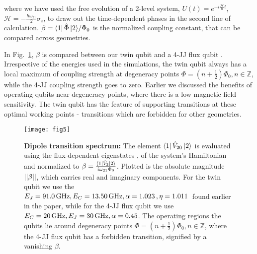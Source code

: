 \noindent  where  we have  used  the  free evolution  of  a
2-level  system,  $ U(t)=e^{-i  \frac{\mathcal{H}}{\hbar}t}  $,
$ \mathcal{H}  = -\frac{\hbar\omega_{21}}{2}\sigma_z  $, to draw  out the
time-dependent phases  in the  second line  of calculation.
$\beta  = {\Bra{1}\hat{\Phi}\Ket{2}}/{\Phi_0}  $ is  the normalized
coupling constant, that can be compared across geometries.

In Fig.~\ref{fig:fig5},  $\beta$ is  compared between  our twin
qubit   and  a   4-JJ   flux   qubit  \cite{honigl2018}   .
Irrespective of  the energies used in  the simulations, the
twin qubit always has a  local maximum of coupling strength
at                     degeneracy                    points
$ \Phi  = (n+\frac{1}{2})\Phi_0,  n\in\mathbb{Z} $, while  the 4-JJ
coupling strength  goes to  zero. Earlier we  discussed the
benefits of operating qubits  near degeneracy points, where
there is a low magnetic  field sensitivity.  The twin qubit
has  the  feature   of  supporting  \ilra  {}
transitions at  these optimal working points  - transitions
which are forbidden for other geometries.

\begin{figure}[h]
  \centering \texttt{[image: fig5]}
  \caption{\small \textbf{Dipole  transition spectrum:} The
    element $  \Bra{1}\hat{V}_{20}\Ket{2} $  is evaluated
    using the flux-dependent eigenstates , 
    of the  system's Hamiltonian and normalized to $\beta=\frac{\Bra{1}\hat{V}_2  \Ket{2}}{i\omega_{21}\Phi_0}$. Plotted is the absolute magnitude $\left|\left|\beta\right|\right|$, which carries real and imaginary components. For the twin qubit we use the $ E_J =  91.0\,\text{GHz}, E_C  = 13.50\,\text{GHz}, \alpha  = 1.023\,\text{},  \eta =
      1.011\,\text{} $ found earlier in the paper, while for the 4-JJ flux qubit we use $ E_{C} = 20\,\text{GHz}, E_J=30\,\text{GHz}, \alpha=0.45 $. The operating regions the qubits lie around degeneracy points $  \Phi =  (n+\frac{1}{2})\Phi_0,  n\in\mathbb{Z}  $, where the 4-JJ flux qubit has a forbidden  \ilra {} transition, signified by a vanishing $\beta$.
    \label{fig:fig5}}
\end{figure}



